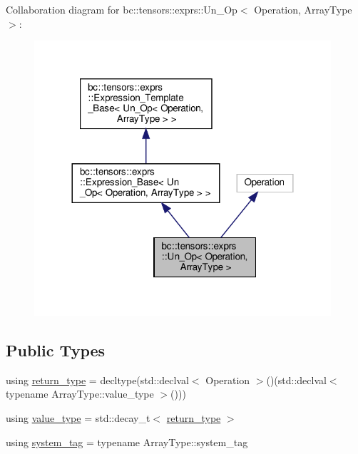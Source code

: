 Collaboration diagram for bc\+:\+:tensors\+:\+:exprs\+:\+:Un\+\_\+\+Op$<$ Operation, Array\+Type $>$\+:\nopagebreak
\begin{figure}[H]
\begin{center}
\leavevmode
\includegraphics[width=312pt]{structbc_1_1tensors_1_1exprs_1_1Un__Op__coll__graph}
\end{center}
\end{figure}
\subsection*{Public Types}
\begin{DoxyCompactItemize}
\item 
using \hyperlink{structbc_1_1tensors_1_1exprs_1_1Un__Op_aabfd9e86607b84279553abb4a02dc0d0}{return\+\_\+type} = decltype(std\+::declval$<$ Operation $>$()(std\+::declval$<$ typename Array\+Type\+::value\+\_\+type $>$()))
\item 
using \hyperlink{structbc_1_1tensors_1_1exprs_1_1Un__Op_a8c87b36ec972937cd789e6517fb47369}{value\+\_\+type} = std\+::decay\+\_\+t$<$ \hyperlink{structbc_1_1tensors_1_1exprs_1_1Un__Op_aabfd9e86607b84279553abb4a02dc0d0}{return\+\_\+type} $>$
\item 
using \hyperlink{structbc_1_1tensors_1_1exprs_1_1Un__Op_abd1390e4fcf0a46b7c2f20a15bb82ec1}{system\+\_\+tag} = typename Array\+Type\+::system\+\_\+tag
\end{DoxyCompactItemize}
